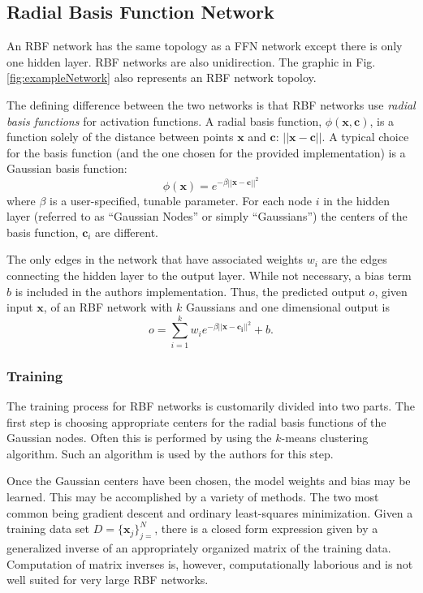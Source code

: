 \documentclass[conference]{IEEEtran}
\begin{document}
  \subsection{Radial Basis Function Network}
  An RBF network has the same topology as a FFN network except there is only one hidden layer. RBF networks are also unidirection. The graphic in Fig. \ref{fig:exampleNetwork} also represents an RBF network topoloy.

  The defining difference between the two networks is that RBF networks use \textit{radial basis functions} for activation functions. A radial basis function, $\phi(\mathbf{x}, \mathbf{c})$, is a function solely of the distance between points $\mathbf{x}$ and $\mathbf{c}$: $||\mathbf{x} - \mathbf{c}||$. A typical choice for the basis function (and the one chosen for the provided implementation) is a Gaussian basis function:
  $$
  \phi(\mathbf{x}) = e^{-\beta ||\mathbf{x} - \mathbf{c}||^2}
  $$
  where $\beta$ is a user-specified, tunable parameter.
  For each node $i$ in the hidden layer (referred to as ``Gaussian Nodes'' or simply ``Gaussians'') the centers of the basis function, $\mathbf{c}_i$ are different.

  The only edges in the network that have associated weights $w_i$ are the edges connecting the hidden layer to the output layer. While not necessary, a bias term $b$ is included in the authors implementation. Thus, the predicted output $o$, given input $\mathbf{x}$, of an RBF network with $k$ Gaussians and one dimensional output is
  $$
  o = \sum_{i=1}^k w_i e^{-\beta ||\mathbf{x} - \mathbf{c_i}||^2} + b.
  $$
  
    \subsubsection{Training}
    The training process for RBF networks is customarily divided into two parts. The first step is choosing appropriate centers for the radial basis functions of the Gaussian nodes. Often this is performed by using the $k$-means clustering algorithm. Such an algorithm is used by the authors for this step.

    Once the Gaussian centers have been chosen, the model weights and bias may be learned. This may be accomplished by a variety of methods. The two most common being gradient descent and ordinary least-squares minimization. Given a training data set $D = \{\mathbf{x}_j\}_{j=}^N$, there is a closed form expression given by a generalized inverse of an appropriately organized matrix of the training data. Computation of matrix inverses is, however, computationally laborious and is not well suited for very large RBF networks.
\end{document}
